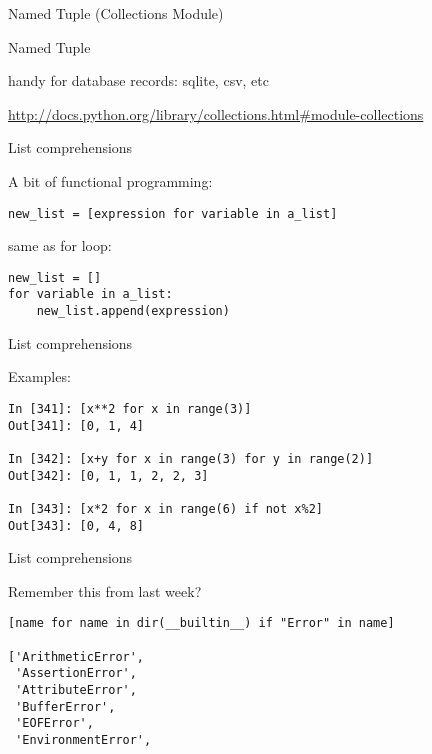 \documentclass{beamer}
\begin{document}
\begin{frame}[fragile]{Named Tuple (Collections Module) }

\vfill
{\Large Named Tuple}

\vfill
{\Large handy for database records: sqlite, csv, etc}

\vfill
\url{http://docs.python.org/library/collections.html#module-collections}

\end{frame} 

\begin{frame}[fragile]{List comprehensions}

{\Large A bit of functional programming:}

\begin{verbatim}
new_list = [expression for variable in a_list]
\end{verbatim}

{\Large same as for loop:}

\begin{verbatim}
new_list = []
for variable in a_list:
    new_list.append(expression)
\end{verbatim}

\end{frame} 

\begin{frame}[fragile]{List comprehensions}

{\Large Examples:}

\begin{verbatim}
In [341]: [x**2 for x in range(3)]
Out[341]: [0, 1, 4]

In [342]: [x+y for x in range(3) for y in range(2)]
Out[342]: [0, 1, 1, 2, 2, 3]

In [343]: [x*2 for x in range(6) if not x%2]
Out[343]: [0, 4, 8]
\end{verbatim}

\end{frame} 

\begin{frame}[fragile]{List comprehensions}

{\Large Remember this from last week?}

\begin{verbatim}
[name for name in dir(__builtin__) if "Error" in name]

['ArithmeticError',
 'AssertionError',
 'AttributeError',
 'BufferError',
 'EOFError',
 'EnvironmentError',
\end{verbatim}

\end{frame} 
\end{document}
